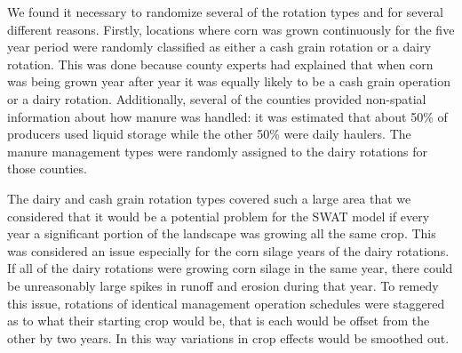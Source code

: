 
We found it necessary to randomize several of the rotation types and for several different reasons. Firstly, locations where corn was grown continuously for the five year period were randomly classified as either a cash grain rotation or a dairy rotation. This was done because county experts had explained that when corn was being grown year after year it was equally likely to be a cash grain operation or a dairy rotation. Additionally, several of the counties provided non-spatial information about how manure was handled: it was estimated that about 50\% of producers used liquid storage while the other 50\% were daily haulers. The manure management types were randomly assigned to the dairy rotations for those counties.  

The dairy and cash grain rotation types covered such a large area that we considered that it would be a potential problem for the SWAT model if every year a significant portion of the landscape was growing all the same crop. This was considered an issue especially for the corn silage years of the dairy rotations. If all of the dairy rotations were growing corn silage in the same year, there could be unreasonably large spikes in runoff and erosion during that year. To remedy this issue, rotations of identical management operation schedules were staggered as to what their starting crop would be, that is each would be offset from the other by two years. In this way variations in crop effects would be smoothed out.
